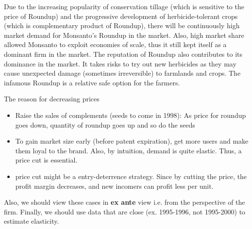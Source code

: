 \documentclass[a4paper]{article}
\begin{document}
    \begin{answer}[Q5]
    Due to the increasing popularity of conservation tillage (which is sensitive to the price of Roundup) and the progressive development of herbicide-tolerant crops (which is complementary product of Roundup), there will be continuously high market demand for Monsanto's Roundup in the market. Also, high market share allowed Monsanto to exploit economies of scale, thus it still kept itself as a dominant firm in the market. The reputation of Roundup also contributes to its dominance in the market. It takes risks to try out new herbicides as they may cause unexpected damage (sometimes irreversible) to farmlands and crops. The infamous Roundup is a relative safe option for the farmers. 
    \end{answer}
    \begin{remarks}[courses]
    The reason for decreasing prices
    \begin{itemize}
        \item Raise the sales of complements (seeds to come in 1998): As price for roundup goes down, quantity of roundup goes up and so do the seeds
        \item To gain market size early (before patent expiration), get more users and make them loyal to the brand. Also, by intuition, demand is quite elastic. Thus, a price cut is essential.
        \item price cut might be a entry-deterrence strategy. Since by cutting the price, the profit margin decreases, and new incomers can profit less per unit. 
    \end{itemize}
    Also, we should view these cases in \textbf{ex ante} view i.e. from the perspective of the firm. Finally, we should use data that are close (ex. 1995-1996, not 1995-2000) to estimate elasticity.
    \end{remarks}
    
\end{document}

